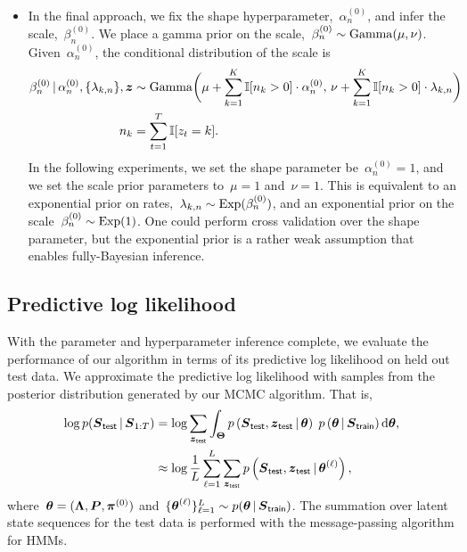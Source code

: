 \begin{itemize}
\item In the final approach, we fix the shape
  hyperparameter,~$\alpha_n^{(0)}$, and infer the scale,~$\beta_n^{(0)}$.  We
  place a gamma prior on the scale,~$\beta_n^{(0)} \sim \mathrm{Gamma}(\mu,
  \nu)$. Given~$\alpha_n^{(0)}$, the conditional distribution of the scale
  is
\begin{align*}
  \beta_n^{(0)} \,|\, \alpha_n^{(0)}, \{\lambda_{k,n}\}, \boldsymbol{z}  
  &\sim \mathrm{Gamma}\bigg(
    \mu + \sum_{k=1}^K \mathbb{I}[n_k > 0] \cdot \alpha_n^{(0)}, \,
    \nu + \sum_{k=1}^K \mathbb{I}[n_k > 0] \cdot \lambda_{k,n} \bigg) \\
  n_k &= \sum_{t=1}^T \mathbb{I}[z_t=k].
\end{align*}
In the following experiments, we set the shape parameter
be~$\alpha_n^{(0)}=1$, and we set the scale prior parameters to~$\mu=1$
and~$\nu=1$.  This is equivalent to an exponential prior on
rates,~$\lambda_{k,n} \sim \mathrm{Exp}(\beta_n^{(0)})$, and an
exponential prior on the scale~$\beta_n^{(0)} \sim \mathrm{Exp}(1)$.
One could perform cross validation over the shape parameter, but the
exponential prior is a rather weak assumption that enables
fully-Bayesian inference.


\end{itemize}


\subsection{Predictive log likelihood}
With the parameter and hyperparameter inference complete, we evaluate
the performance of our algorithm in terms of its predictive log
likelihood on held out test data. We approximate the predictive log
likelihood with samples from the posterior distribution generated by
our MCMC algorithm. That is,
\begin{align*}
\log p(\boldsymbol{S}_{\mathsf{test}} \,|\, \boldsymbol{S}_{1:T}) &= \log \sum_{\boldsymbol{z}_{\mathsf{test}}} \int_{\boldsymbol{\Theta}} p\left(\boldsymbol{S}_{\mathsf{test}}, \boldsymbol{z}_{\mathsf{test}} \,|\, \boldsymbol{\theta} \right) \; p\left(\boldsymbol{\theta} \,|\, \boldsymbol{S}_{\mathsf{train}} \right) \mathrm{d}\boldsymbol{\theta}, \\
&\approx \log \frac{1}{L} \sum_{\ell=1}^L \sum_{\boldsymbol{z}_{\mathsf{test}}} p\left(\boldsymbol{S}_{\mathsf{test}},  \boldsymbol{z}_{\mathsf{test}} \,|\, \boldsymbol{\theta}^{(\ell)} \right),
\end{align*}
where~${\boldsymbol{\theta}=(\boldsymbol{\Lambda}, \boldsymbol{P}, \boldsymbol{\pi}^{(0)})}$ and~$\{\boldsymbol{\theta}^{(\ell)} \}_{\ell=1}^L
\sim p(\boldsymbol{\theta} \,|\, \boldsymbol{S}_{\mathsf{train}})$. The summation over latent state
sequences for the test data is performed with the message-passing
algorithm for HMMs.

